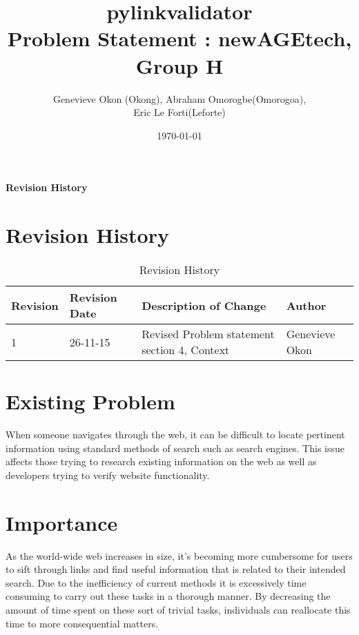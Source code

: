 \documentclass[12pt]{article}
\begin{document}
\title{pylinkvalidator \\
 Problem Statement : newAGEtech, Group H }
\author{Genevieve Okon (Okong), Abraham Omorogbe(Omorogoa),\\
 Eric Le Forti(Leforte)}
\date{\today}
\maketitle

\tableofcontents
\listoffigures
\listoftables

\textbf{Revision History} \\ \normalsize
\pagebreak

\section{Revision History}
\begin{table}[h!]
	\begin{tabular}{| p{5cm} | p{5cm} | p{5cm} |p{5cm} |}    \hline
Revision  &Revision Date &Description of Change &Author\\ \hline
1& 26-11-15& Revised Problem statement section 4, Context&Genevieve Okon\\ \hline
       \end{tabular}
       
       \caption{Revision History}
       \label{table:Revision History}
\end{table}



	
\section{Existing Problem}

When someone navigates through the web, it can be difficult to locate pertinent information using standard methods of search such as search engines. This issue affects those trying to research existing information on the web as well as developers trying to verify website functionality.\newline

\section{Importance}

As the world-wide web increases in size, it's becoming more cumbersome for users to sift through links and find useful information that is related to their intended search. Due to the inefficiency of current methods it is excessively time consuming to carry out these tasks in a thorough manner. By decreasing the amount of time spent on these sort of trivial tasks, individuals can reallocate this time to more consequential matters. \newline
\end{document}
